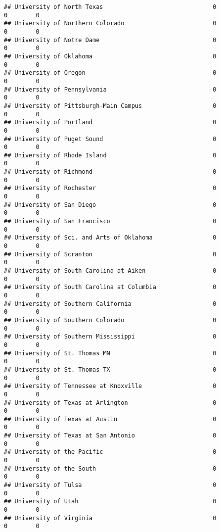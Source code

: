 \documentclass[
]{article}
\begin{document}
\begin{verbatim}
## University of North Texas                               0           0        0
## University of Northern Colorado                         0           0        0
## University of Notre Dame                                0           0        0
## University of Oklahoma                                  0           0        0
## University of Oregon                                    0           0        0
## University of Pennsylvania                              0           0        0
## University of Pittsburgh-Main Campus                    0           0        0
## University of Portland                                  0           0        0
## University of Puget Sound                               0           0        0
## University of Rhode Island                              0           0        0
## University of Richmond                                  0           0        0
## University of Rochester                                 0           0        0
## University of San Diego                                 0           0        0
## University of San Francisco                             0           0        0
## University of Sci. and Arts of Oklahoma                 0           0        0
## University of Scranton                                  0           0        0
## University of South Carolina at Aiken                   0           0        0
## University of South Carolina at Columbia                0           0        0
## University of Southern California                       0           0        0
## University of Southern Colorado                         0           0        0
## University of Southern Mississippi                      0           0        0
## University of St. Thomas MN                             0           0        0
## University of St. Thomas TX                             0           0        0
## University of Tennessee at Knoxville                    0           0        0
## University of Texas at Arlington                        0           0        0
## University of Texas at Austin                           0           0        0
## University of Texas at San Antonio                      0           0        0
## University of the Pacific                               0           0        0
## University of the South                                 0           0        0
## University of Tulsa                                     0           0        0
## University of Utah                                      0           0        0
## University of Virginia                                  0           0        0

\end{verbatim}
\end{document}
